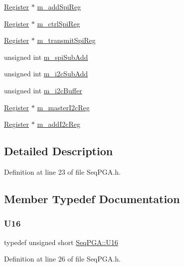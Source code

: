 \begin{DoxyCompactItemize}
\item 
\hyperlink{classRegister}{Register} $\ast$ \hyperlink{classSeqPGA_af31d87ad56c501584ccb9c60776a1289}{m\+\_\+add\+Spi\+Reg}
\item 
\hyperlink{classRegister}{Register} $\ast$ \hyperlink{classSeqPGA_ab6597288860f5172540059345256f9a9}{m\+\_\+ctrl\+Spi\+Reg}
\item 
\hyperlink{classRegister}{Register} $\ast$ \hyperlink{classSeqPGA_a4e0ffb37b1cd947d389354ac25723ab8}{m\+\_\+transmit\+Spi\+Reg}
\item 
unsigned int \hyperlink{classSeqPGA_afd5442d9b92f9b59bd553df9bd91dd87}{m\+\_\+spi\+Sub\+Add}
\item 
unsigned int \hyperlink{classSeqPGA_a82bda98edb9681aff47733e83ac8bc4f}{m\+\_\+i2c\+Sub\+Add}
\item 
unsigned int \hyperlink{classSeqPGA_afcef519379e9c6ba624ba58a4eac79f1}{m\+\_\+i2c\+Buffer}
\item 
\hyperlink{classRegister}{Register} $\ast$ \hyperlink{classSeqPGA_a942c71b33a4f43b7a994cb9216abb17e}{m\+\_\+master\+I2c\+Reg}
\item 
\hyperlink{classRegister}{Register} $\ast$ \hyperlink{classSeqPGA_ac3a6aad3fec65ceb78528b6d20deeb3f}{m\+\_\+add\+I2c\+Reg}
\end{DoxyCompactItemize}


\subsection{Detailed Description}


Definition at line 23 of file Seq\+P\+G\+A.\+h.



\subsection{Member Typedef Documentation}
\mbox{\label{classSeqPGA_ab58f68f9484bdc99722a29f533f0d4e3}} 
\subsubsection{\texorpdfstring{U16}{U16}}
{\footnotesize\ttfamily typedef unsigned short \hyperlink{classSeqPGA_ab58f68f9484bdc99722a29f533f0d4e3}{Seq\+P\+G\+A\+::\+U16}}



Definition at line 26 of file Seq\+P\+G\+A.\+h.

